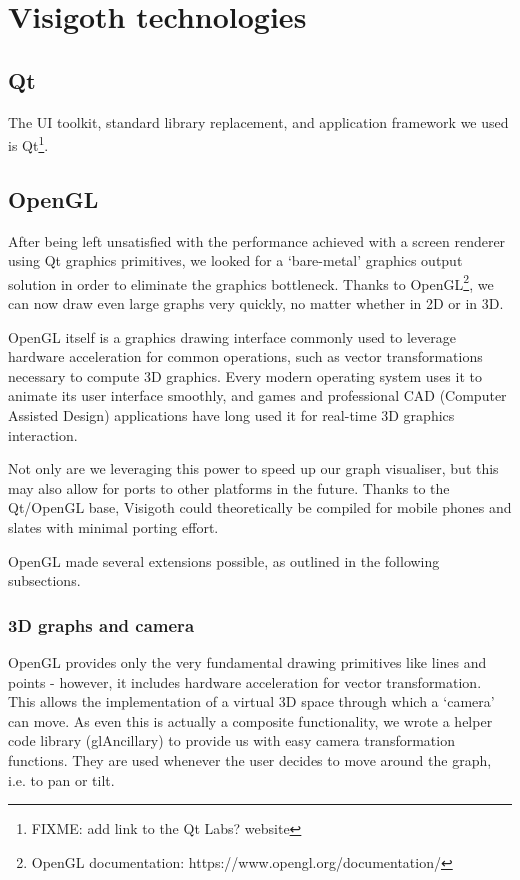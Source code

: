 \documentclass[a4paper,11pt,titlepage]{article}
\let\stdsection\section         %
\renewcommand{\section}{\newpage\stdsection}
\begin{document}
\section{Visigoth technologies}

\subsection{Qt}

The UI toolkit, standard library replacement, and application
framework we used is Qt\footnote{FIXME: add link to the Qt Labs?
  website}.

\subsection{OpenGL}

After being left unsatisfied with the performance achieved with a
screen renderer using Qt graphics primitives, we looked for a `bare-metal'
graphics output solution in order to eliminate the graphics bottleneck.
Thanks to OpenGL\footnote{OpenGL documentation:
https://www.opengl.org/documentation/},
we can now draw even large graphs very quickly,
no matter whether in 2D or in 3D.

OpenGL itself is a graphics drawing interface commonly used to
leverage hardware acceleration for common operations, such as vector
transformations necessary to compute 3D graphics. Every modern
operating system uses it to animate its user interface smoothly,
and games and professional CAD (Computer Assisted Design) applications
have long used it for real-time 3D graphics interaction.

Not only are we leveraging this power to speed up our graph
visualiser, but this may also allow for ports to other
platforms in the future. Thanks to the Qt/OpenGL base, Visigoth
could theoretically be compiled for mobile phones and slates
with minimal porting effort.

OpenGL made several extensions possible, as outlined in the following
subsections.

\subsubsection{3D graphs and camera}
OpenGL provides only the very fundamental drawing primitives like
lines and points - however, it includes hardware acceleration for
vector transformation. This allows the implementation of a virtual
3D space through which a `camera' can move. As even this is actually
a composite functionality, we wrote a helper code library (glAncillary)
to provide us with easy camera transformation functions. They are
used whenever the user decides to move around the graph, i.e. to
pan or tilt.
\end{document}
